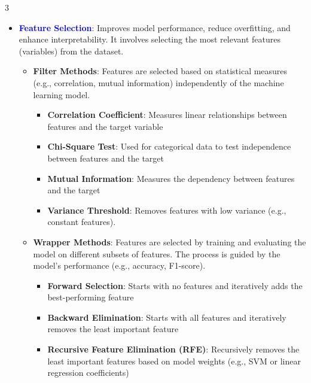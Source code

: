 \documentclass[letterpaper, 10.5pt,landscape]{article}
\begin{document}
\begin{multicols*}{3}
\begin{itemize}[leftmargin=0.35cm]
    \item \textcolor{blue}{\textbf{Feature Selection}:}
    Improves model performance, reduce overfitting, and enhance interpretability. It involves selecting the most relevant features (variables) from the dataset. 
    \vspace{-2pt}
    \begin{itemize}[leftmargin=0.35cm]
        \vspace{-3pt}
        \item \textbf{Filter Methods}: Features are selected based on statistical measures (e.g., correlation, mutual information) independently of the machine learning model. 
        \vspace{-2pt}
        \begin{itemize}[leftmargin=0.35cm]
            \vspace{-2pt}
            \item \textbf{Correlation Coefficient}: Measures linear relationships between features and the target variable
            \vspace{-2pt}
            \item \textbf{Chi-Square Test}: Used for categorical data to test independence between features and the target
            \vspace{-2pt}
            \item \textbf{Mutual Information}: Measures the dependency between features and the target
            \vspace{-2pt}
            \item \textbf{Variance Threshold}: Removes features with low variance (e.g., constant features).
        \end{itemize}
        
        \item \textbf{Wrapper Methods}: Features are selected by training and evaluating the model on different subsets of features. The process is guided by the model's performance (e.g., accuracy, F1-score). 
        \vspace{-2pt}
        \begin{itemize}[leftmargin=0.35cm]
            \vspace{-2pt}
            \item \textbf{Forward Selection}: Starts with no features and iteratively adds the best-performing feature
            \vspace{-2pt}
            \item \textbf{Backward Elimination}: Starts with all features and iteratively removes the least important feature
            \vspace{-2pt}
            \item \textbf{Recursive Feature Elimination (RFE)}: Recursively removes the least important features based on model weights (e.g., SVM or linear regression coefficients)
        \end{itemize}
        

\end{itemize}
\end{itemize}
\end{multicols*}
\end{document}

